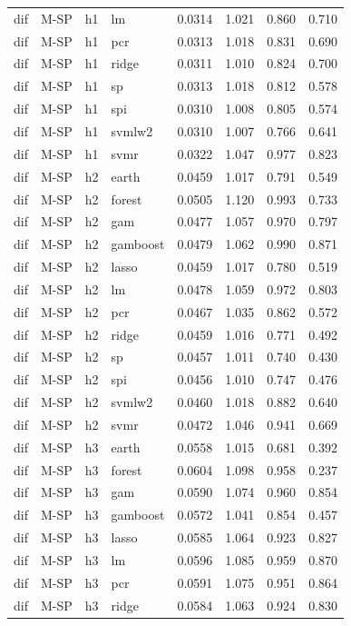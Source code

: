 \begin{ThreePartTable}
\begin{longtable}[t]{llclcccc}
dif & M-SP & h1 & lm & 0.0314 & 1.021 & 0.860 & 0.710\\
dif & M-SP & h1 & pcr & 0.0313 & 1.018 & 0.831 & 0.690\\
dif & M-SP & h1 & ridge & 0.0311 & 1.010 & 0.824 & 0.700\\
dif & M-SP & h1 & sp & 0.0313 & 1.018 & 0.812 & 0.578\\
dif & M-SP & h1 & spi & 0.0310 & 1.008 & 0.805 & 0.574\\
dif & M-SP & h1 & svmlw2 & 0.0310 & 1.007 & 0.766 & 0.641\\
dif & M-SP & h1 & svmr & 0.0322 & 1.047 & 0.977 & 0.823\\
\addlinespace
dif & M-SP & h2 & earth & 0.0459 & 1.017 & 0.791 & 0.549\\
dif & M-SP & h2 & forest & 0.0505 & 1.120 & 0.993 & 0.733\\
dif & M-SP & h2 & gam & 0.0477 & 1.057 & 0.970 & 0.797\\
dif & M-SP & h2 & gamboost & 0.0479 & 1.062 & 0.990 & 0.871\\
dif & M-SP & h2 & lasso & 0.0459 & 1.017 & 0.780 & 0.519\\
dif & M-SP & h2 & lm & 0.0478 & 1.059 & 0.972 & 0.803\\
dif & M-SP & h2 & pcr & 0.0467 & 1.035 & 0.862 & 0.572\\
dif & M-SP & h2 & ridge & 0.0459 & 1.016 & 0.771 & 0.492\\
dif & M-SP & h2 & sp & 0.0457 & 1.011 & 0.740 & 0.430\\
dif & M-SP & h2 & spi & 0.0456 & 1.010 & 0.747 & 0.476\\
dif & M-SP & h2 & svmlw2 & 0.0460 & 1.018 & 0.882 & 0.640\\
dif & M-SP & h2 & svmr & 0.0472 & 1.046 & 0.941 & 0.669\\
\addlinespace
dif & M-SP & h3 & earth & 0.0558 & 1.015 & 0.681 & 0.392\\
dif & M-SP & h3 & forest & 0.0604 & 1.098 & 0.958 & 0.237\\
dif & M-SP & h3 & gam & 0.0590 & 1.074 & 0.960 & 0.854\\
dif & M-SP & h3 & gamboost & 0.0572 & 1.041 & 0.854 & 0.457\\
dif & M-SP & h3 & lasso & 0.0585 & 1.064 & 0.923 & 0.827\\
dif & M-SP & h3 & lm & 0.0596 & 1.085 & 0.959 & 0.870\\
dif & M-SP & h3 & pcr & 0.0591 & 1.075 & 0.951 & 0.864\\
dif & M-SP & h3 & ridge & 0.0584 & 1.063 & 0.924 & 0.830\\

\end{longtable}
\end{ThreePartTable}
